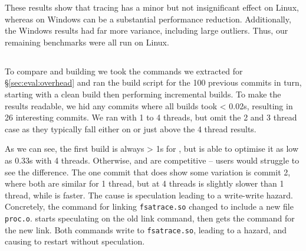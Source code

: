 
These results show that tracing has a minor but not insignificant effect on Linux, whereas on Windows can be a substantial performance reduction. Additionally, the Windows results had far more variance, including large outliers. Thus, our remaining benchmarks were all run on Linux.

\subsection{\Fsatrace}
\label{sec:eval:fsatrace}

To compare \Make and \Rattle building \Fsatrace we took the commands we extracted for \S\ref{sec:eval:overhead} and ran the build script for the 100 previous commits in turn, starting with a clean build then performing incremental builds. To make the results readable, we hid any commits where all builds took < 0.02s, resulting in 26 interesting commits. We ran with 1 to 4 threads, but omit the 2 and 3 thread case as they typically fall either on or just above the 4 thread results.



As we can see, the first build is always > 1s for \Rattle, but \Make is able to optimise it as low as 0.33s with 4 threads. Otherwise, \Rattle and \Make are competitive -- users would struggle to see the difference. The one commit that does show some variation is commit 2, where both are similar for 1 thread, but \Rattle at 4 threads is slightly slower than 1 thread, while \Make is faster. The cause is speculation leading to a write-write hazard. Concretely, the command for linking \texttt{fsatrace.so} changed to include a new file \texttt{proc.o}. \Rattle starts speculating on the old link command, then gets the command for the new link. Both commands write to \texttt{fsatrace.so}, leading to a hazard, and causing \Rattle to restart without speculation.

